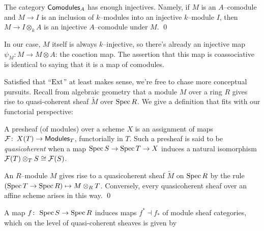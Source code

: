 \begin{corollary}
The category $\mathsf{Comodules}_A$ has enough injectives.  Namely, if $M$ is an $A$--comodule and $M \to I$ is an inclusion of $k$--modules into an injective $k$--module $I$, then $M \to I \otimes_k A$ is an injective $A$--comodule under $M$. \qed
\end{corollary}
\begin{remark}
In our case, $M$ itself is always $k$--injective, so there's already an injective map $\psi_M: M \to M \otimes A$: the coaction map.  The assertion that this map is coassociative is identical to saying that it is a map of comodules.
\end{remark}

Satisfied that ``$\operatorname{Ext}$'' at least makes sense, we're free to chase more conceptual pursuits.  Recall from algebraic geometry that a module $M$ over a ring $R$ gives rise to quasi-coherent sheaf $\widetilde{M}$ over $\operatorname{Spec} R$.  We give a definition that fits with our functorial perspective:
\begin{definition}
A presheaf (of modules) over a scheme $X$ is an assignment of maps $\mathcal{F}\colon\thinspace X(T) \to \mathsf{Modules}_T$, functorially in $T$.   Such a presheaf is said to be \textit{quasicoherent} when a map $\operatorname{Spec} S \to \operatorname{Spec} T \to X$ induces a natural isomorphism $\mathcal{F}(T) \otimes_T S \cong \mathcal{F}(S)$.
\end{definition}

\begin{lemma}
An $R$--module $M$ gives rise to a quasicoherent sheaf $\widetilde M$ on $\operatorname{Spec} R$ by the rule $(\operatorname{Spec} T \to \operatorname{Spec} R) \mapsto M \otimes_R T$.  Conversely, every quasicoherent sheaf over an affine scheme arises in this way.  \qed
\end{lemma}

\begin{definition}
A map $f\colon\thinspace \operatorname{Spec} S \to \operatorname{Spec} R$ induces maps $f^* \dashv f_*$ of module sheaf categories, which on the level of quasi-coherent sheaves is given by
\begin{center}
\end{center}
\end{definition}

